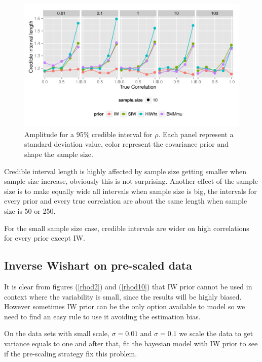 \documentclass{article}
\begin{document}
\begin{figure}[htbp]
   \centering
   \includegraphics[width=\textwidth]{cilength} %
    \vspace{-.5in}
   \caption{Amplitude for a 95\% credible interval for $\rho$. Each panel represent a standard deviation value,  color represent the covariance prior and shape the sample size.  \label{cilength} }
\end{figure}

Credible interval length is highly affected by sample size getting smaller when sample size increase, obviously this is not surprising. Another effect of the sample size is to make equally wide all intervals when sample size is big, the intervals for every prior and every true correlation are about the same length when sample size is 50 or 250. 

For the small sample size case, credible intervals are wider on high correlations for every prior except IW. 


\subsection{Inverse Wishart on pre-scaled data}

It is clear from figures (\ref{rhod2}) and (\ref{rhod10}) that IW prior cannot be used in context where the variability is small, since the results will be highly biased. However sometimes IW prior can be the only option available to model so we need to find an easy rule to use it avoiding the estimation bias. 

On the data sets with small scale, $\sigma=0.01$ and $\sigma=0.1$ we scale the data to get variance equals to one and after that, fit the bayesian model with IW prior to see if the pre-scaling strategy fix this problem. 
\end{document}
